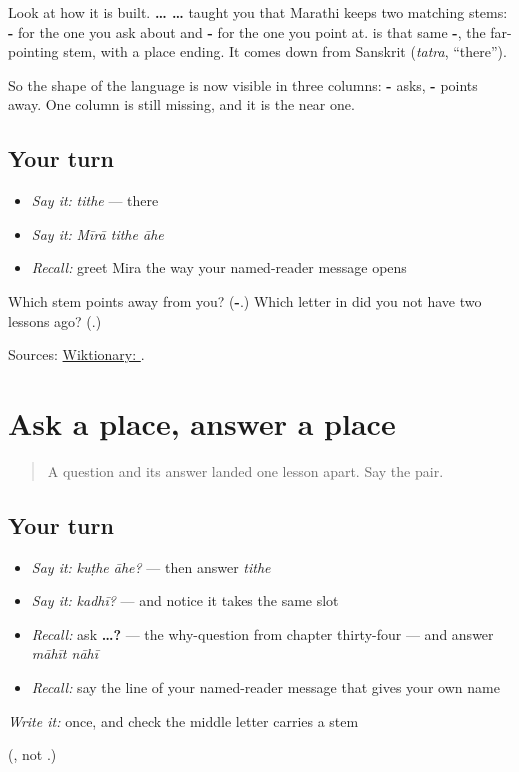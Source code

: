 Look at how it is built. \textbf{ …  …} taught you that Marathi keeps two matching stems: \textbf{-} for the one you ask about and \textbf{-} for the one you point at. \textbf{} is that same \textbf{-}, the far-pointing stem, with a place ending. It comes down from Sanskrit \textbf{} (\emph{tatra}, \textquotedblleft{}there\textquotedblright{}).

So the shape of the language is now visible in three columns: \textbf{-} asks, \textbf{-} points away. One column is still missing, and it is the near one.

\subsection*{Your turn}
\begin{itemize}
\raggedright
  \item \emph{Say it:} \emph{tithe} — there
  \item \emph{Say it:} \emph{Mīrā tithe āhe}
  \item \emph{Recall:} greet Mira the way your named-reader message opens
\end{itemize}

\begin{tcolorbox}[breakable,colback=teal!4,colframe=teal!35!black,title={Before you move on}]
Which stem points away from you? (\textbf{-}.) Which letter in \textbf{} did you not have two lessons ago? (\textbf{}.)

Sources: \href{https://en.wiktionary.org/wiki/\%E0\%A4\%A4\%E0\%A4\%BF\%E0\%A4\%A5\%E0\%A5\%87}{Wiktionary: }.
\end{tcolorbox}
\section[\texorpdfstring{\mr{कुठे}? — \mr{तिथे}. (kuṭhe? — tithe.)}{कुठे? — तिथे. (kuṭhe? — tithe.)}]{Ask a place, answer a place}

\label{lesson:MR-R39-there}



\begin{quote}
A question and its answer landed one lesson apart. Say the pair.
\end{quote}

\subsection*{Your turn}
\begin{itemize}
\raggedright
  \item \emph{Say it:} \emph{kuṭhe āhe?} — then answer \emph{tithe}
  \item \emph{Say it:} \emph{kadhī?} — and notice it takes the same slot
  \item \emph{Recall:} ask \textbf{ …?} — the why-question from chapter thirty-four — and answer \emph{māhīt nāhī}
  \item \emph{Recall:} say the line of your named-reader message that gives your own name
\end{itemize}

\begin{tcolorbox}[breakable,colback=teal!4,colframe=teal!35!black,title={Before you move on}]
\emph{Write it:} \textbf{} once, and check the middle letter carries a stem

(\textbf{}, not \textbf{}.)
\end{tcolorbox}
